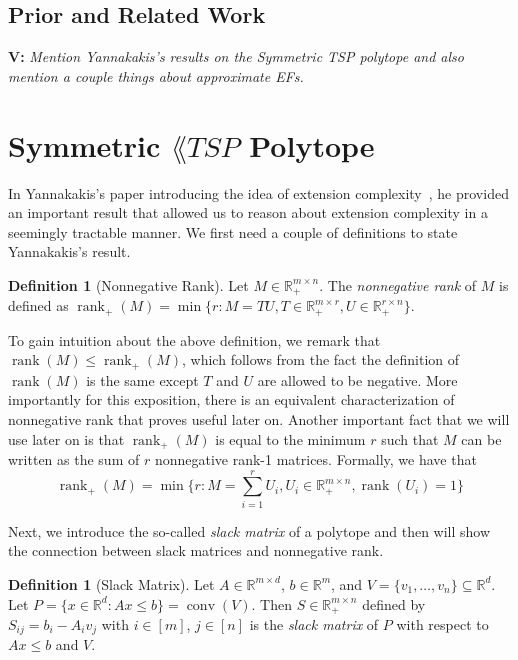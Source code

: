 \documentclass{article}
\theoremstyle{definition}
\newtheorem{definition}[theorem]{Definition}
\theoremstyle{remark}
\newcommand{\nrank}{\operatorname{rank}_+}
\newcommand{\rank}{\operatorname{rank}}
\newcommand{\conv}{\operatorname{conv}}
\renewcommand{\R}{\mathbb{R}}
\newcommand{\vnote}[1]{{\color{magenta}\noindent\textbf{V: }\marginpar{****}\textit{{#1}}}}
\begin{document}
\subsection{Prior and Related Work}\label{sec:Yannakakis}

\vnote{Mention Yannakakis's results on the Symmetric TSP polytope and also mention a couple things about approximate EFs.}

\section{Symmetric $\lang{TSP}$ Polytope}

In Yannakakis's paper introducing the idea of extension complexity~\cite{yannakakis}, he provided an important result that allowed us to reason about extension complexity in a seemingly tractable manner. We first need a couple of definitions to state Yannakakis's result.

\begin{definition}[Nonnegative Rank]
Let $M \in \R_+^{m \times n}$. The \emph{nonnegative rank} of $M$ is defined as $\nrank(M) = \min\{r : M = TU, T \in \R_+^{m \times r}, U \in \R_+^{r \times n}\}$.
\end{definition}

To gain intuition about the above definition, we remark that $\rank(M) \le \nrank(M)$, which follows from the fact the definition of $\rank(M)$ is the same except $T$ and $U$ are allowed to be negative. More importantly for this exposition, there is an equivalent characterization of nonnegative rank that proves useful later on. Another important fact that we will use later on is that $\nrank(M)$ is equal to the minimum $r$ such that $M$ can be written as the sum of $r$ nonnegative rank-1 matrices. Formally, we have that 
\[
\nrank(M) = \min\{r : M =\sum_{i=1}^r U_i, U_i \in \R_+^{m \times n}, \rank(U_i) = 1\}
\]

Next, we introduce the so-called \emph{slack matrix} of a polytope and then will show the connection between slack matrices and nonnegative rank.

\begin{definition}[Slack Matrix]
Let $A \in \R^{m \times d}$, $b \in \R^m$, and $V = \{v_1, \ldots, v_n\} \subseteq \R^d$. Let $P = \{x \in \R^d : Ax \le b\} = \conv(V)$. Then $S \in \R_+^{m\times n}$ defined by $S_{ij} = b_i - A_i v_j$ with $i \in [m]$, $j \in [n]$ is the \emph{slack matrix} of $P$ with respect to $Ax \le b$ and $V$.
\end{definition}
\end{document}
